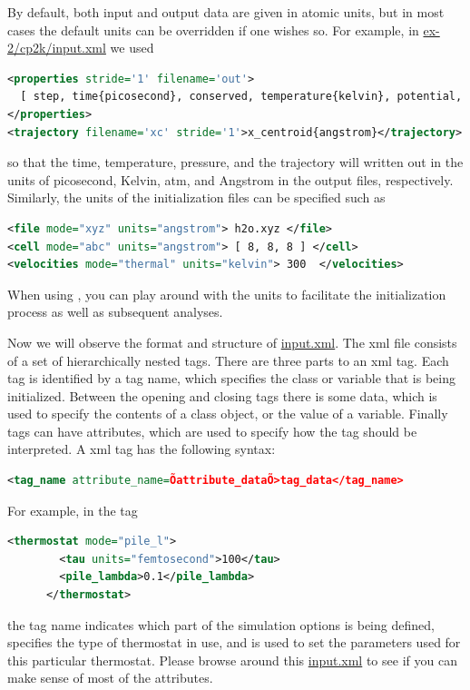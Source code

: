 \documentclass{article}
\begin{document}
\begin{Exercise}[label={basic},title={Keywords, outputs, and units of \ipi{}}]
By default, both input and output data are given in atomic
units, but in most cases the default units can be overridden if one
wishes so. 
For example, in \url{ex-2/cp2k/input.xml}
we used
\begin{lstlisting}[language=xml]
<properties stride='1' filename='out'>
  [ step, time{picosecond}, conserved, temperature{kelvin}, potential, pressure_cv{atmosphere} ]
</properties>
<trajectory filename='xc' stride='1'>x_centroid{angstrom}</trajectory>
\end{lstlisting}
so that the time, temperature, pressure, and the trajectory will written out in the units of picosecond, Kelvin, atm, and Angstrom in the output files, respectively.
Similarly, the units of the initialization files can be specified such as
\begin{lstlisting}[language=xml]
<file mode="xyz" units="angstrom"> h2o.xyz </file>
<cell mode="abc" units="angstrom"> [ 8, 8, 8 ] </cell>
<velocities mode="thermal" units="kelvin"> 300  </velocities>
\end{lstlisting}
When using \ipi{}, you can play around with the units to facilitate the initialization process as well as subsequent analyses. 

\Question
Now we will observe the format and structure of \url{input.xml}.
The xml file consists of a set of hierarchically nested tags. There are three
parts to an xml tag. Each tag is identified by a tag name, which specifies the class
or variable that is being initialized. Between the opening and closing tags there is some data, 
which is used to specify the
contents of a class object, or the value of a variable. Finally tags can have attributes,
which are used to specify how the tag should be interpreted.
A xml tag has the following syntax:
\begin{lstlisting}[language=xml]
<tag_name attribute_name=Õattribute_dataÕ>tag_data</tag_name>
\end{lstlisting}
For example, in the tag
\begin{lstlisting}[language=xml]
      <thermostat mode="pile_l">
        <tau units="femtosecond">100</tau> 
        <pile_lambda>0.1</pile_lambda>
      </thermostat>
\end{lstlisting}
the tag name  indicates which part of the simulation options is being defined,
 specifies the type of thermostat in use,
and  is used to set the parameters used for this particular thermostat.
Please browse around this \url{input.xml} to see if you can make sense of most of the attributes.


\end{Exercise}
\end{document}
